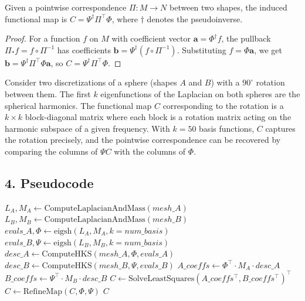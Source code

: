 \begin{theorem}\label{thm:fm_from_pointwise}
Given a pointwise correspondence $\Pi: M \to N$ between two shapes, the induced functional map is $C = \Psi^\dagger \Pi^\top \Phi$, where $\dagger$ denotes the pseudoinverse.
\end{theorem}

\begin{proof}
For a function $f$ on $M$ with coefficient vector $\mathbf{a} = \Phi^\dagger f$, the pullback $\Pi_* f = f \circ \Pi^{-1}$ has coefficients $\mathbf{b} = \Psi^\dagger (f \circ \Pi^{-1})$. Substituting $f = \Phi \mathbf{a}$, we get $\mathbf{b} = \Psi^\dagger \Pi^\top \Phi \mathbf{a}$, so $C = \Psi^\dagger \Pi^\top \Phi$.
\end{proof}

\begin{example}\label{ex:functional_map}
Consider two discretizations of a sphere (shapes $A$ and $B$) with a $90^\circ$ rotation between them. The first $k$ eigenfunctions of the Laplacian on both spheres are the spherical harmonics. The functional map $C$ corresponding to the rotation is a $k \times k$ block-diagonal matrix where each block is a rotation matrix acting on the harmonic subspace of a given frequency. With $k = 50$ basis functions, $C$ captures the rotation precisely, and the pointwise correspondence can be recovered by comparing the columns of $\Psi C$ with the columns of $\Phi$.
\end{example}

\subsection{4. Pseudocode}

\begin{algorithm}
\caption{Compute Functional Map}
\label{alg:compute_functional_map}
\begin{algorithmic}[1]
    \State $L_A, M_A \gets \text{ComputeLaplacianAndMass}(mesh\_A)$
    \State $L_B, M_B \gets \text{ComputeLaplacianAndMass}(mesh\_B)$
    \State $evals\_A, \Phi \gets \text{eigsh}(L_A, M_A, k=num\_basis)$
    \State $evals\_B, \Psi \gets \text{eigsh}(L_B, M_B, k=num\_basis)$
    \State $desc\_A \gets \text{ComputeHKS}(mesh\_A, \Phi, evals\_A)$
    \State $desc\_B \gets \text{ComputeHKS}(mesh\_B, \Psi, evals\_B)$
    \State $A\_coeffs \gets \Phi^\top \cdot M_A \cdot desc\_A$
    \State $B\_coeffs \gets \Psi^\top \cdot M_B \cdot desc\_B$
    \State $C \gets \text{SolveLeastSquares}(A\_coeffs^\top, B\_coeffs^\top)^\top$
    \State $C \gets \text{RefineMap}(C, \Phi, \Psi)$ 
    \State \Return $C$
\EndFunction
\end{algorithmic}
\end{algorithm}

